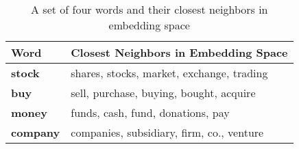 \begin{table}[!ht]
\centering

\begin{tabular}{ll}
\toprule
\textbf{Word} & \multicolumn{1}{c}{\textbf{Closest Neighbors in Embedding Space}}\\
\midrule

\textbf{stock} & shares, stocks, market, exchange, trading\\
\textbf{buy} & sell, purchase, buying, bought, acquire\\
\textbf{money} & funds, cash, fund, donations, pay\\
\textbf{company} & companies, subsidiary, firm, co., venture\\


\bottomrule
\end{tabular}
\caption{A set of four words and their closest neighbors in embedding space}
\label{table-glove-demo}
\end{table}
